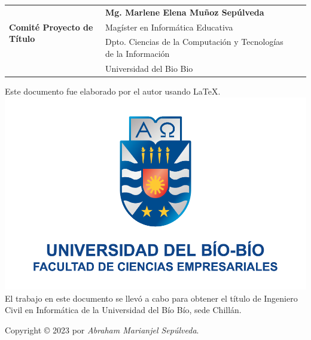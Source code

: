 \begin{frontmatter}
\begin{flushleft}
\begin{tabular}{ l | l l l}
			\multirow{3}{3.4cm}{\textbf{\large Comité Proyecto de Título}} & {\textbf{\large Mg. Marlene Elena Muñoz Sepúlveda}}\\
			& {Magíster en Informática Educativa}\\
			& {Dpto. Ciencias de la Computación y Tecnologías de la Información}\\
			& {Universidad del Bio Bio}\\

		\end{tabular}\par
	\end{flushleft}
	

	\vspace{1cm}
	\begin{minipage}[t]{15cm}
		Este documento fue elaborado por el autor usando \LaTeX. 				\includegraphics[scale=0.19]{img/logo-face.png}  \\
		El trabajo en este documento se llevó a cabo para obtener el título de Ingeniero Civil en Informática de la Universidad del Bío Bío, sede Chillán.\\
	\par Copyright © 2023 por \textit{Abraham Marianjel Sepúlveda}.
	\end{minipage}
	
\end{frontmatter}